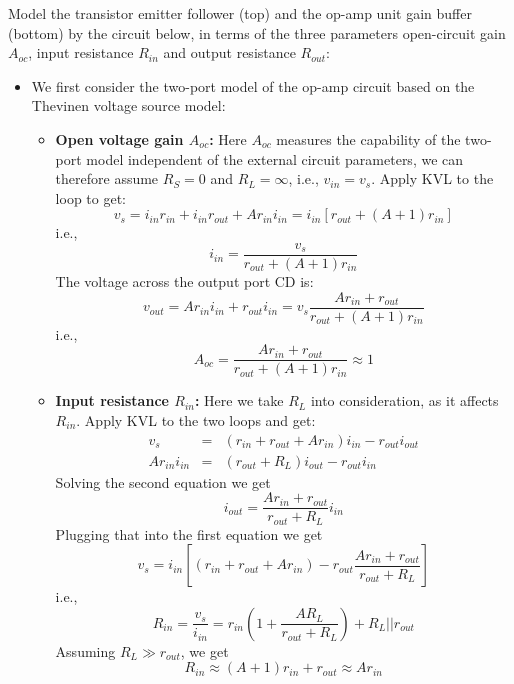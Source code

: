 \usepackage{html}




  Model the transistor emitter follower (top) and the op-amp unit gain 
  buffer (bottom) by the circuit below, in terms of the three parameters
  open-circuit gain $A_{oc}$, input resistance $R_{in}$ and output 
  resistance $R_{out}$:


  \begin{itemize}
  \item We first consider the two-port model of the op-amp circuit
    based on the Thevinen voltage source model:

    \begin{itemize}
    \item {\bf Open voltage gain $A_{oc}$:} Here $A_{oc}$ measures
      the capability of the two-port model independent of the 
      external circuit parameters, we can therefore assume $R_S=0$ 
      and $R_L=\infty$, i.e., $v_{in}=v_s$. Apply KVL to the loop to 
      get:
      \[
      v_s=i_{in} r_{in} +i_{in} r_{out} +A r_{in} i_{in}
      =i_{in}\left[r_{out}+(A+1) r_{in}\right] 
      \]
      i.e.,
      \[
      i_{in}=\frac{v_s}{r_{out}+(A+1) r_{in}} 
      \]
      The voltage across the output port CD is:
      \[
      v_{out}=A r_{in} i_{in}+r_{out}i_{in}
      =v_s\frac{A r_{in}+r_{out}}{r_{out}+(A+1) r_{in}} 
      \]
      i.e.,
      \[
      A_{oc}=\frac{A r_{in}+r_{out}}{r_{out}+(A+1) r_{in}} \approx 1 
      \]
  
    \item {\bf Input resistance $R_{in}$:} Here we take $R_L$ into 
      consideration, as it affects $R_{in}$. Apply KVL to the two 
      loops and get:
      \begin{eqnarray}
        v_s&=&(r_{in}+r_{out}+A r_{in})i_{in}-r_{out}i_{out} 
        \nonumber\\
        Ar_{in}i_{in}&=&(r_{out}+R_L)i_{out}-r_{out} i_{in}
        \nonumber
      \end{eqnarray}
      Solving the second equation we get
      \[
      i_{out}=\frac{Ar_{in}+r_{out}}{r_{out}+R_L} i_{in} 
      \]
      Plugging that into the first equation we get
      \[ 
      v_s =i_{in}\left[(r_{in}+r_{out}+A r_{in})
        -r_{out}\frac{Ar_{in}+r_{out}}{r_{out}+R_L}\right] 
      \]
      i.e.,
      \[
      R_{in}=\frac{v_s}{i_{in}}=r_{in}\left(1+\frac{AR_L}{r_{out}+R_L}\right)
      +R_L||r_{out}
      \]
      Assuming $R_L\gg r_{out}$, we get 
      \[
      R_{in}\approx (A+1) r_{in}+r_{out}\approx Ar_{in}
      \]


\end{itemize}
\end{itemize}
